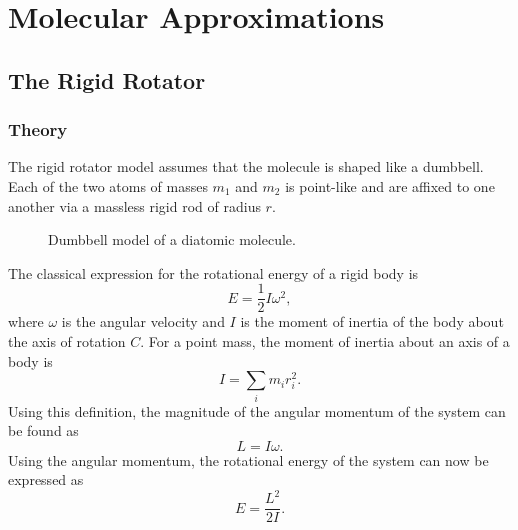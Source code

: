 \chapter{Molecular Approximations}
\label{c:molecular_approximations}

\section{The Rigid Rotator}
\label{s:the_rigid_rotator}

\subsection{Theory}

The rigid rotator model assumes that the molecule is shaped like a dumbbell. Each of the two atoms of masses $m_1$ and $m_2$ is point-like and are affixed to one another via a massless rigid rod of radius $r$.

\begin{figure}[H]
    \centering
    \caption{Dumbbell model of a diatomic molecule.}
    \label{f:dumbbell_model}
\end{figure}

The classical expression for the rotational energy of a rigid body is
\begin{equation*}
    E = \frac{1}{2}I\omega^2,
\end{equation*}
where $\omega$ is the angular velocity and $I$ is the moment of inertia of the body about the axis of rotation $C$. For a point mass, the moment of inertia about an axis of a body is
\begin{equation*}
    I = \sum_i m_i r_i^2.
\end{equation*}
Using this definition, the magnitude of the angular momentum of the system can be found as
\begin{equation*}
    L = I\omega.
\end{equation*}
Using the angular momentum, the rotational energy of the system can now be expressed as
\begin{equation*}
    E = \frac{L^2}{2I}.
\end{equation*}

